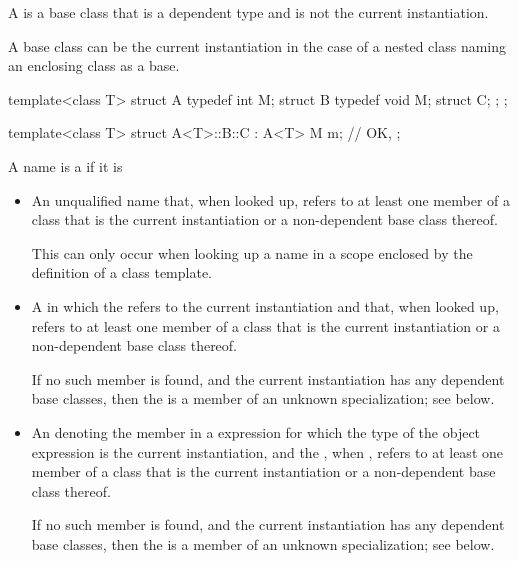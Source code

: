 \pnum
{}%
A  is a base class that is a dependent type and is
not the current instantiation.
\begin{note}
A base class can be the current instantiation in the case of a nested class
naming an enclosing class as a base.
\begin{example}
\begin{codeblock}
template<class T> struct A {
  typedef int M;
  struct B {
    typedef void M;
    struct C;
  };
};

template<class T> struct A<T>::B::C : A<T> {
  M m;                          // OK, 
};
\end{codeblock}
\end{example}
\end{note}

\pnum
{}%
A name is a
if it is

\begin{itemize}
\item
An unqualified name that, when looked up, refers to
at least one member of a class that is
the current instantiation or a non-dependent base class thereof.
\begin{note}
This can only occur when looking up a name in a scope enclosed by the
definition of a class template.
\end{note}
\item
A
in which the
refers to the current instantiation
and that, when looked up, refers to at least one member of a class that is
the current
instantiation or a non-dependent base class thereof.
\begin{note}
If no such
member is found, and the current instantiation has any dependent base classes,
then the  is a member of an unknown specialization;
see below.
\end{note}

\item
An  denoting the member in a 
expression for which the type of the object expression is the
current instantiation, and the , when , refers to at least one member of a class
that is the current
instantiation or a non-dependent base class thereof.
\begin{note}
If no such
member is found, and the current instantiation has any dependent base classes,
then the  is a member of an unknown specialization;
see below.
\end{note}
\end{itemize}


